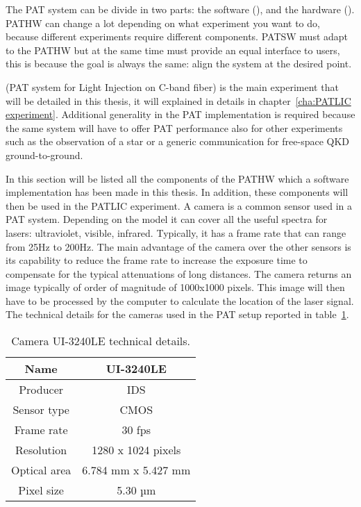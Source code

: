 The PAT system can be divide in two parts: the software (), and the hardware ().
PATHW can change a lot depending on what experiment you want to do, because different experiments require different components. PATSW must adapt to the PATHW but at the same time must provide an equal interface to users, this is because the goal is always the same: align the system at the desired point.

 (PAT system for Light Injection on C-band fiber) is the main experiment that will be detailed in this thesis, it will explained in details in chapter~\ref{cha:PATLIC experiment}.
Additional generality in the PAT implementation is required because the same system will have to offer PAT performance also for other experiments such as the observation of a star or a generic communication for free-space QKD ground-to-ground.

In this section will be listed all the components of the PATHW which a software implementation has been made in this thesis. In addition, these components will then be used in the PATLIC experiment.
A camera is a common sensor used in a PAT system. Depending on the model it can cover all the useful spectra for lasers: ultraviolet, visible, infrared.
Typically, it has a frame rate that can range from 25Hz to 200Hz. The main advantage of the camera over the other sensors is its capability to reduce the frame rate to increase the exposure time to compensate for the typical attenuations of long distances.
The camera returns an image typically of order of magnitude of 1000x1000 pixels. This image will then have to be processed by the computer to calculate the location of the laser signal.
The technical details for the cameras used in the PAT setup reported in table~\ref{table:1}.

\begin{table}[h!]
  \centering
  \begin{tabular}{ |c|c| }
    \hline
    Name         & UI-3240LE           \\\hline
    Producer     & IDS                 \\\hline
    Sensor type  & CMOS                \\\hline
    Frame rate   & 30 fps              \\\hline
    Resolution   & 1280 x 1024 pixels  \\\hline
    Optical area & 6.784 mm x 5.427 mm \\\hline
    Pixel size   & 5.30 µm             \\\hline
  \end{tabular}
  \caption{Camera UI-3240LE technical details.}
  \label{table:1}
\end{table}


